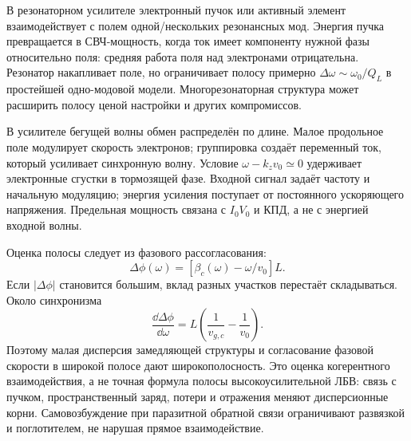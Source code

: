 
В резонаторном усилителе электронный пучок или активный элемент взаимодействует с полем одной/нескольких резонансных мод. Энергия пучка превращается в СВЧ-мощность, когда ток имеет компоненту нужной фазы относительно поля: средняя работа поля над электронами отрицательна. Резонатор накапливает поле, но ограничивает полосу примерно $\Delta\omega\sim\omega_0/Q_L$ в простейшей одно-модовой модели. Многорезонаторная структура может расширить полосу ценой настройки и других компромиссов.

В усилителе бегущей волны обмен распределён по длине. Малое продольное поле модулирует скорость электронов; группировка создаёт переменный ток, который усиливает синхронную волну. Условие $\omega-k_zv_0\simeq0$ удерживает электронные сгустки в тормозящей фазе. Входной сигнал задаёт частоту и начальную модуляцию; энергия усиления поступает от постоянного ускоряющего напряжения. Предельная мощность связана с $I_0V_0$ и КПД, а не с энергией входной волны.

Оценка полосы следует из фазового рассогласования:
\begin{equation}
 \Delta\phi(\omega)=[\beta_c(\omega)-\omega/v_0]L.
\end{equation}
Если $|\Delta\phi|$ становится большим, вклад разных участков перестаёт складываться. Около синхронизма
\begin{equation}
 \frac{\dd\Delta\phi}{\dd\omega}=L\left(\frac1{v_{g,c}}-\frac1{v_0}\right).
\end{equation}
Поэтому малая дисперсия замедляющей структуры и согласование фазовой скорости в широкой полосе дают широкополосность. Это оценка когерентного взаимодействия, а не точная формула полосы высокоусилительной ЛБВ: связь с пучком, пространственный заряд, потери и отражения меняют дисперсионные корни. Самовозбуждение при паразитной обратной связи ограничивают развязкой и поглотителем, не нарушая прямое взаимодействие.
